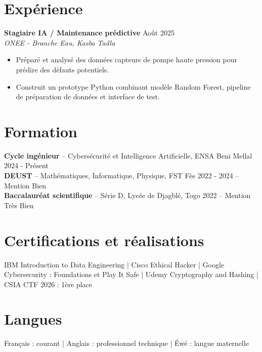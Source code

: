 \documentclass[10pt,a4paper]{article}
\newcommand{\role}[3]{%
  \textbf{#1} \hfill #3\\
  \textit{#2}\vspace{1pt}
}
\newcommand{\edu}[4]{%
  \textbf{#1} -- #2 \hfill #3 #4\\[-1pt]
}
\begin{document}
\section{Expérience}
\role{Stagiaire IA / Maintenance prédictive}{ONEE - Branche Eau, Kasba Tadla}{Août 2025}
\begin{itemize}
  \item Préparé et analysé des données capteurs de pompe haute pression pour prédire des défauts potentiels.
  \item Construit un prototype Python combinant modèle Random Forest, pipeline de préparation de données et interface de test.
\end{itemize}

\section{Formation}
\edu{Cycle ingénieur}{Cybersécurité et Intelligence Artificielle, ENSA Beni Mellal}{2024 - Présent}{}
\edu{DEUST}{Mathématiques, Informatique, Physique, FST Fès}{2022 - 2024}{-- Mention Bien}
\edu{Baccalauréat scientifique}{Série D, Lycée de Djagblé, Togo}{2022}{-- Mention Très Bien}

\section{Certifications et réalisations}
IBM Introduction to Data Engineering | Cisco Ethical Hacker | Google Cybersecurity : Foundations et Play It Safe | Udemy Cryptography and Hashing | CSIA CTF 2026 : 1ère place

\section{Langues}
Français : courant | Anglais : professionnel technique | Éwé : langue maternelle
\end{document}
